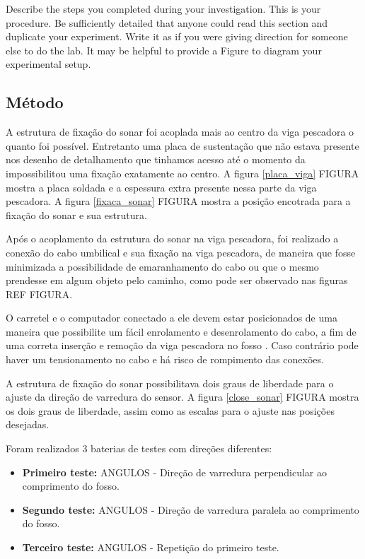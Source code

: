 
Describe the steps you completed during your investigation. This is your procedure. Be sufficiently detailed that anyone could read this section and duplicate your experiment. Write it as if you were giving direction for someone else to do the lab. It may be helpful to provide a Figure to diagram your experimental setup.


\subsection{Método}

A estrutura de fixação do sonar foi acoplada mais ao centro da viga pescadora o
quanto foi possível. Entretanto uma placa de sustentação que não estava presente
nos desenho de detalhamento que tinhamos acesso até o momento da impossibilitou
uma fixação exatamente ao centro. A figura \ref{placa_viga} FIGURA mostra a
placa soldada e a espessura extra presente nessa parte da viga pescadora. A figura
\ref{fixaca_sonar} FIGURA mostra a posição encotrada para a fixação do sonar e
sua estrutura.

Após o acoplamento da estrutura do sonar na viga pescadora, foi realizado a
conexão do cabo umbilical e sua fixação na viga pescadora, de maneira que fosse
minimizada a possibilidade de emaranhamento do cabo ou que o mesmo prendesse em
algum objeto pelo caminho, como pode ser observado nas figuras REF FIGURA.

O carretel e o computador conectado a ele devem estar posicionados de uma
maneira que possibilite um fácil enrolamento e desenrolamento do cabo, a fim de
uma correta inserção e remoção da viga pescadora no fosso %
. Caso contrário pode haver um tensionamento no cabo e há risco de rompimento
das conexões.

A estrutura de fixação do sonar possibilitava dois graus de liberdade para o
ajuste da direção de varredura do sensor. A figura \ref{close_sonar} FIGURA
mostra os dois graus de liberdade, assim como as escalas para o ajuste nas
posições desejadas.

Foram realizados 3 baterias de testes com direções diferentes:  

\begin{itemize}
  \item \textbf{Primeiro teste:} ANGULOS - Direção de varredura perpendicular ao
  comprimento do fosso.
  \item \textbf{Segundo teste:} ANGULOS - Direção de varredura paralela ao
  comprimento do fosso.
  \item \textbf{Terceiro teste:} ANGULOS - Repetição do primeiro teste.
\end{itemize}

